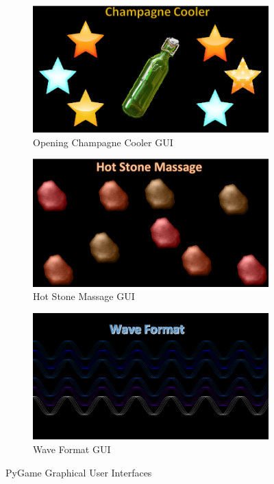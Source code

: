 \documentclass{l4proj}
\begin{document}
\begin{figure}[!htb]
    \centering
    \begin{subfigure}[b]{0.45\textwidth}
        \includegraphics[scale = 0.22]{images/champagneGUI.png}
        \caption{Opening Champagne Cooler GUI}
        \label{fig:champGUI}
    \end{subfigure}
    \begin{subfigure}[b]{0.45\textwidth}
        \includegraphics[scale = 0.22]{images/hotStoneGUI.png}
        \caption{Hot Stone Massage GUI}
        \label{fig:stoneGUI}
    \end{subfigure}
    \begin{subfigure}[b]{0.45\textwidth}
        \includegraphics[scale = 0.22]{images/waveFormat.png}
        \caption{Wave Format GUI}
        \label{fig:waveGUI}
    \end{subfigure}
    \caption{PyGame Graphical User Interfaces}
    \label{fig:pygameGUI}
\end{figure}
\end{document}
